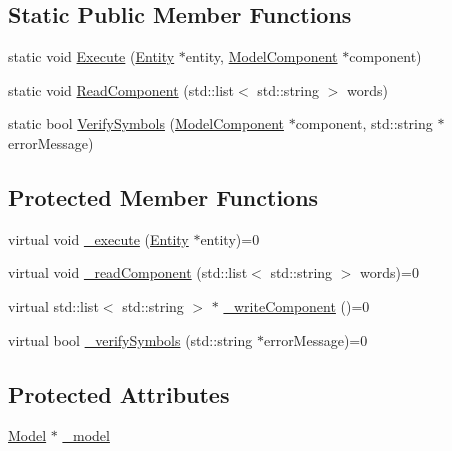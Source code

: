 \subsection*{Static Public Member Functions}
\begin{DoxyCompactItemize}
\item 
static void \hyperlink{class_model_component_a08c5312c2f94f6621577cc1836c2d3e0}{Execute} (\hyperlink{class_entity}{Entity} $\ast$entity, \hyperlink{class_model_component}{Model\-Component} $\ast$component)
\item 
static void \hyperlink{class_model_component_a1629e990c010688878b8d378058e8eeb}{Read\-Component} (std\-::list$<$ std\-::string $>$ words)
\item 
static bool \hyperlink{class_model_component_a0798a220cf903b34ce28c40e136d207d}{Verify\-Symbols} (\hyperlink{class_model_component}{Model\-Component} $\ast$component, std\-::string $\ast$error\-Message)
\end{DoxyCompactItemize}
\subsection*{Protected Member Functions}
\begin{DoxyCompactItemize}
\item 
virtual void \hyperlink{class_model_component_ae3fcf8bbdd8368c882438424aa73f714}{\-\_\-execute} (\hyperlink{class_entity}{Entity} $\ast$entity)=0
\item 
virtual void \hyperlink{class_model_component_aa16546b209d8fda2c8fa951e88652973}{\-\_\-read\-Component} (std\-::list$<$ std\-::string $>$ words)=0
\item 
virtual std\-::list$<$ std\-::string $>$ $\ast$ \hyperlink{class_model_component_a5847971e860713d9df3e41c603c772c0}{\-\_\-write\-Component} ()=0
\item 
virtual bool \hyperlink{class_model_component_a183696468482133b2a09b761b7770521}{\-\_\-verify\-Symbols} (std\-::string $\ast$error\-Message)=0
\end{DoxyCompactItemize}
\subsection*{Protected Attributes}
\begin{DoxyCompactItemize}
\item 
\hyperlink{class_model}{Model} $\ast$ \hyperlink{class_model_component_a9d9e835755618a794c9759882641bc3c}{\-\_\-model}
\end{DoxyCompactItemize}


